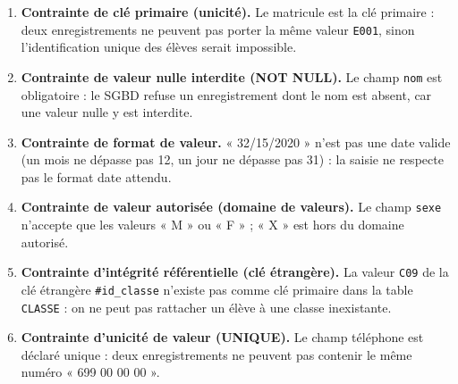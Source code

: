 \documentclass[11pt]{article}
\newcommand{\cle}[1]{{\popxbold\color{popdark}#1}}
\begin{document}
\begin{corrige}
\begin{enumerate}
\item \textbf{Contrainte de \cle{clé primaire} (unicité).} Le matricule est la clé primaire : deux enregistrements ne peuvent pas porter la même valeur \texttt{E001}, sinon l'identification unique des élèves serait impossible.
\item \textbf{Contrainte de \cle{valeur nulle interdite} (NOT NULL).} Le champ \texttt{nom} est obligatoire : le SGBD refuse un enregistrement dont le nom est absent, car une valeur nulle y est interdite.
\item \textbf{Contrainte de \cle{format de valeur}.} « 32/15/2020 » n'est pas une date valide (un mois ne dépasse pas 12, un jour ne dépasse pas 31) : la saisie ne respecte pas le format date attendu.
\item \textbf{Contrainte de \cle{valeur autorisée} (domaine de valeurs).} Le champ \texttt{sexe} n'accepte que les valeurs « M » ou « F » ; « X » est hors du domaine autorisé.
\item \textbf{Contrainte d'\cle{intégrité référentielle} (clé étrangère).} La valeur \texttt{C09} de la clé étrangère \texttt{\#id\_classe} n'existe pas comme clé primaire dans la table \texttt{CLASSE} : on ne peut pas rattacher un élève à une classe inexistante.
\item \textbf{Contrainte d'\cle{unicité de valeur} (UNIQUE).} Le champ téléphone est déclaré unique : deux enregistrements ne peuvent pas contenir le même numéro « 699 00 00 00 ».
\end{enumerate}
\end{corrige}
\end{document}
